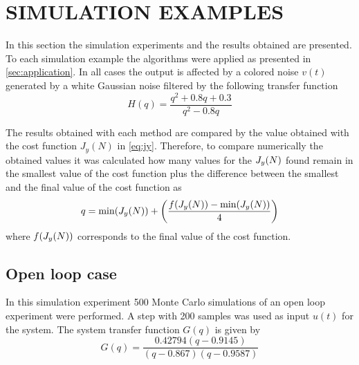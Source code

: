 \section{\label{sec:experiments} SIMULATION EXAMPLES}

In this section the simulation experiments and the results obtained are presented.
To each simulation example the algorithms were applied as presented in \autoref{sec:application}.
In all cases the output is affected by a colored noise $v(t)$ generated by a white Gaussian noise filtered by the following transfer function
\begin{equation*}
	H(q) = \frac{q^2 + 0.8q + 0.3}{q^2 - 0.8q}
\end{equation*}

The results obtained with each method are compared by the value obtained with the cost function $J_y(N)$ in \eqref{eq:jy}.
Therefore, to compare numerically the obtained values it was calculated how many values for the $J_y(N)$ found remain in the smallest value of the cost function plus the difference between the smallest and the final value of the cost function as
\begin{equation}
	q = \text{min}(J_y(N)) + \left( \frac{f(J_y(N)) - \text{min}(J_y(N))}{4} \right)
\label{eq:threshold_jy}
\end{equation}
where $f(J_y(N))$ corresponds to the final value of the cost function.

\subsection{Open loop case}

In this simulation experiment 500 Monte Carlo simulations of an open loop experiment were performed.
A step with 200 samples was used as input $u(t)$ for the system.
The system transfer function $G(q)$ is given by
\begin{equation}
	G(q) = \frac{0.42794 (q-0.9145)}{(q-0.867) (q-0.9587)}
\label{eq:tf_system}
\end{equation}

